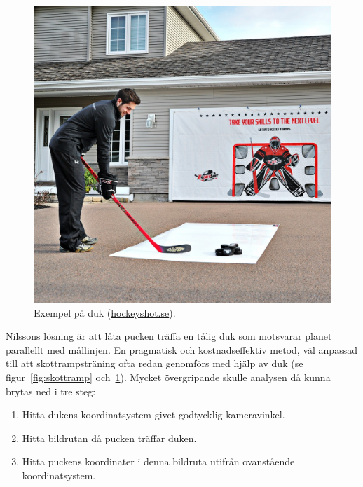 \documentclass[a4paper,12pt]{article}
\begin{document}
\begin{figure}[ht]
  \centering
  \includegraphics[width=\linewidth]{photos/shooting-tarp.jpg}
  \caption{Exempel på duk
  (\href{http://www.hockeyshot.se/HockeyShot-Extreme-Shooting-Tarp-p/target-tarp-032.htm}{hockeyshot.se}).
  \label{fig:duk}}
\end{figure}


Nilssons lösning är att låta pucken träffa en tålig duk som motsvarar planet
parallellt med mållinjen. En pragmatisk och kostnadseffektiv metod, väl
anpassad till att skottrampsträning ofta redan genomförs med hjälp av duk
(se figur~\ref{fig:skottramp} och~\ref{fig:duk}). Mycket övergripande skulle
analysen då kunna brytas ned i tre steg:

\begin{enumerate}
  \item \label{enum:step1} Hitta dukens koordinatsystem givet godtycklig
    kameravinkel.
  \item \label{enum:step2} Hitta bildrutan då pucken träffar duken.
  \item \label{enum:step3} Hitta puckens koordinater i denna bildruta utifrån
    ovanstående koordinatsystem.
\end{enumerate}
\end{document}

